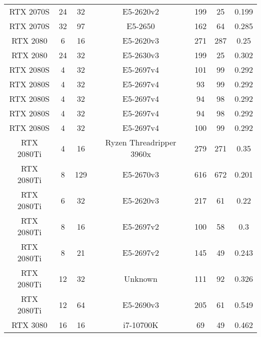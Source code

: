 \begin{table*}[ht!]
\begin{tabular}{@{}ccccccc@{}}
RTX 2070S     & 24        & 32     & E5-2620v2                      & 199           & 25          & 0.199         \\
RTX 2070S     & 32        & 97     & E5-2650                        & 162           & 64          & 0.285         \\
RTX 2080      & 6         & 16     & E5-2620v3                      & 271           & 287         & 0.25          \\
RTX 2080      & 24        & 32     & E5-2630v3                      & 199           & 25          & 0.302         \\
RTX 2080S     & 4         & 32     & E5-2697v4                      & 101           & 99          & 0.292         \\ %
RTX 2080S     & 4         & 32     & E5-2697v4                      & 93            & 99          & 0.292         \\ %
RTX 2080S     & 4         & 32     & E5-2697v4                      & 94            & 98          & 0.292         \\ %
RTX 2080S     & 4         & 32     & E5-2697v4                      & 94            & 98          & 0.292         \\ %
RTX 2080S     & 4         & 32     & E5-2697v4                      & 100           & 99          & 0.292         \\ %
RTX 2080Ti   & 4         & 16     & Ryzen Threadripper 3960x       & 279           & 271          & 0.35          \\
RTX 2080Ti   & 8         & 129    & E5-2670v3                      & 616           & 672          & 0.201         \\
RTX 2080Ti   & 6         & 32     & E5-2620v3                      & 217           & 61           & 0.22          \\
RTX 2080Ti   & 8         & 16     & E5-2697v2                      & 100           & 58           & 0.3           \\
RTX 2080Ti   & 8         & 21     & E5-2697v2                      & 145           & 49           & 0.243         \\
RTX 2080Ti    & 12        & 32     & Unknown                        & 111          & 92          & 0.326         \\
RTX 2080Ti    & 12        & 64     & E5-2690v3                      & 205          & 61          & 0.549         \\
RTX 3080      & 16        & 16     & i7-10700K                      & 69           & 49          & 0.462         \\

\end{tabular}
\end{table*}
